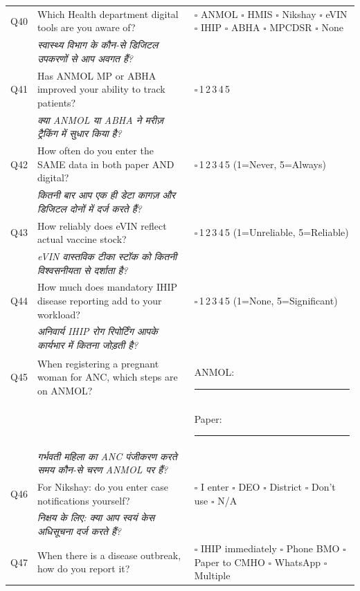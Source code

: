 \documentclass[10pt,a4paper]{article}
\newcommand{\likert}{{\Large$\square$}\,1\quad{\Large$\square$}\,2\quad{\Large$\square$}\,3\quad{\Large$\square$}\,4\quad{\Large$\square$}\,5}
\begin{document}
\noindent\begin{tabularx}{\textwidth}{@{}L{0.8cm} X L{5.2cm}@{}}
Q40 & Which Health department digital tools are you aware of? & {\Large$\square$} ANMOL {\Large$\square$} HMIS {\Large$\square$} Nikshay {\Large$\square$} eVIN {\Large$\square$} IHIP {\Large$\square$} ABHA {\Large$\square$} MPCDSR {\Large$\square$} None \\
 & {\hindifont\small\itshape\color{black!70} स्वास्थ्य विभाग के कौन-से डिजिटल उपकरणों से आप अवगत हैं?} & \\[3pt]
Q41 & Has ANMOL MP or ABHA improved your ability to track patients? & \likert \\
 & {\hindifont\small\itshape\color{black!70} क्या ANMOL या ABHA ने मरीज़ ट्रैकिंग में सुधार किया है?} & \\[3pt]
Q42 & How often do you enter the SAME data in both paper AND digital? & \likert{} {\scriptsize(1=Never, 5=Always)} \\
 & {\hindifont\small\itshape\color{black!70} कितनी बार आप एक ही डेटा कागज़ और डिजिटल दोनों में दर्ज करते हैं?} & \\[3pt]
Q43 & How reliably does eVIN reflect actual vaccine stock? & \likert{} {\scriptsize(1=Unreliable, 5=Reliable)} \\
 & {\hindifont\small\itshape\color{black!70} eVIN वास्तविक टीका स्टॉक को कितनी विश्वसनीयता से दर्शाता है?} & \\[3pt]
Q44 & How much does mandatory IHIP disease reporting add to your workload? & \likert{} {\scriptsize(1=None, 5=Significant)} \\
 & {\hindifont\small\itshape\color{black!70} अनिवार्य IHIP रोग रिपोर्टिंग आपके कार्यभार में कितना जोड़ती है?} & \\[3pt]
Q45 & When registering a pregnant woman for ANC, which steps are on ANMOL? & ANMOL: \rule{5cm}{0.4pt}\\[2pt] && Paper: \rule{5cm}{0.4pt} \\
 & {\hindifont\small\itshape\color{black!70} गर्भवती महिला का ANC पंजीकरण करते समय कौन-से चरण ANMOL पर हैं?} & \\[3pt]
Q46 & For Nikshay: do you enter case notifications yourself? & {\Large$\square$} I enter {\Large$\square$} DEO {\Large$\square$} District {\Large$\square$} Don't use {\Large$\square$} N/A \\
 & {\hindifont\small\itshape\color{black!70} निक्षय के लिए: क्या आप स्वयं केस अधिसूचना दर्ज करते हैं?} & \\[3pt]
Q47 & When there is a disease outbreak, how do you report it? & {\Large$\square$} IHIP immediately {\Large$\square$} Phone BMO {\Large$\square$} Paper to CMHO {\Large$\square$} WhatsApp {\Large$\square$} Multiple \\

\end{tabularx}
\end{document}
